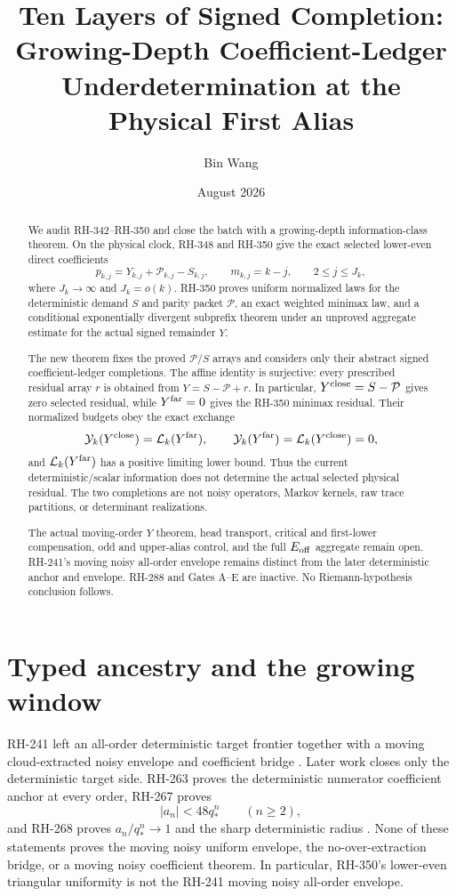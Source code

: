 \documentclass[11pt]{article}
\title{Ten Layers of Signed Completion:\\
Growing-Depth Coefficient-Ledger Underdetermination at the Physical First Alias}
\author{Bin Wang}
\date{August 2026}
\theoremstyle{definition}
\theoremstyle{remark}
\newcommand{\cP}{\mathcal P}
\newcommand{\cY}{\mathcal Y}
\newcommand{\cL}{\mathcal L}
\begin{document}
\maketitle

\begin{abstract}
We audit RH-342--RH-350 and close the batch with a growing-depth
information-class theorem.  On the physical clock, RH-348 and RH-350 give
the exact selected lower-even direct coefficients
\[
 p_{k,j}=Y_{k,j}+\cP_{k,j}-S_{k,j},
 \qquad m_{k,j}=k-j,
 \qquad 2\le j\le J_k,
\]
where $J_k\to\infty$ and $J_k=o(k)$.  RH-350 proves uniform normalized laws
for the deterministic demand $S$ and parity packet $\cP$, an exact weighted
minimax law, and a conditional exponentially divergent subprefix theorem
under an unproved aggregate estimate for the actual signed remainder $Y$.

The new theorem fixes the proved $\cP/S$ arrays and considers only their
abstract signed coefficient-ledger completions.  The affine identity is
surjective: every prescribed residual array $r$ is obtained from
$Y=S-\cP+r$.  In particular, $Y^{\rm close}=S-\cP$ gives zero selected
residual, while $Y^{\rm far}=0$ gives the RH-350 minimax residual.  Their
normalized budgets obey the exact exchange
\[
 \cY_k(Y^{\rm close})=\cL_k(Y^{\rm far}),
 \qquad
 \cY_k(Y^{\rm far})=\cL_k(Y^{\rm close})=0,
\]
and $\cL_k(Y^{\rm far})$ has a positive limiting lower bound.  Thus the
current deterministic/scalar information does not determine the actual
selected physical residual.  The two completions are not noisy operators,
Markov kernels, raw trace partitions, or determinant realizations.

The actual moving-order $Y$ theorem, head transport, critical and
first-lower compensation, odd and upper-alias control, and the full
$E_{\rm off}$ aggregate remain open.  RH-241's moving noisy all-order
envelope remains distinct from the later deterministic anchor and envelope.
RH-288 and Gates A--E are inactive.  No Riemann-hypothesis conclusion
follows.
\end{abstract}

\section{Typed ancestry and the growing window}

RH-241 left an all-order deterministic target frontier together with a
moving cloud-extracted noisy envelope and coefficient bridge
\citep{WangTraceFrontier2026}.  Later work closes only the deterministic
target side.  RH-263 proves the deterministic numerator coefficient anchor
at every order, RH-267 proves
\begin{equation}\label{eq:det-envelope}
 |a_n|<48q_*^n\qquad(n\ge2),
\end{equation}
and RH-268 proves $a_n/q_*^n\to1$ and the sharp deterministic radius
\citep{WangParityAnchor2026,WangUnifiedEnvelope2026,WangSharpRadius2026}.
None of these statements proves the moving noisy uniform envelope, the
no-over-extraction bridge, or a moving noisy coefficient theorem.  In
particular, RH-350's lower-even triangular uniformity is not the RH-241
moving noisy all-order envelope.
\end{document}
